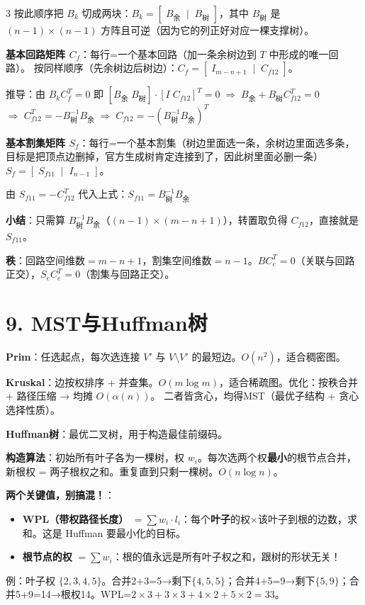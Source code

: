 \documentclass[10pt,a4paper,landscape]{ctexart}
\begin{document}
\begin{multicols}{3}
按此顺序把 $B_k$ 切成两块：$\boxed{B_k=[\;B_{\text{余}}\;\mid\;B_{\text{树}}\;]}$，其中 $B_{\text{树}}$ 是 $(n-1)\times(n-1)$ 方阵且可逆（因为它的列正好对应一棵支撑树）。

\textbf{基本回路矩阵 $C_f$}：每行=一个基本回路（加一条余树边到 $T$ 中形成的唯一回路）。
按同样顺序（先余树边后树边）：$\boxed{C_f=[\;I_{m-n+1}\;\mid\;C_{f12}\;]}$。

推导：由 $B_kC_f^T=0$ 即 $[B_{\text{余}}\;B_{\text{树}}]\cdot[I\;C_{f12}]^T=0\;\Rightarrow\;B_{\text{余}}+B_{\text{树}}C_{f12}^T=0$
$\Rightarrow\;C_{f12}^T=-B_{\text{树}}^{-1}B_{\text{余}}\;\Rightarrow\;\boxed{C_{f12}=-(B_{\text{树}}^{-1}B_{\text{余}})^T}$

\textbf{基本割集矩阵 $S_f$}：每行=一个基本割集（树边里面选一条，余树边里面选多条，目标是把顶点边删掉，官方生成树肯定连接到了，因此树里面必删一条）
$\boxed{S_f=[\;S_{f11}\;\mid\;I_{n-1}\;]}$。

由 $S_{f11}=-C_{f12}^T$ 代入上式：$\boxed{S_{f11}=B_{\text{树}}^{-1}B_{\text{余}}}$

\textbf{小结}：只需算 $B_{\text{树}}^{-1}B_{\text{余}}$（$(n-1)\times(m-n+1)$），转置取负得 $C_{f12}$，直接就是 $S_{f11}$。

\textbf{秩}：回路空间维数$=m-n+1$，割集空间维数$=n-1$。$BC_e^T=0$（关联与回路正交），$S_eC_e^T=0$（割集与回路正交）。

\section*{9. MST与Huffman树}

\textbf{Prim}：任选起点，每次选连接 $V'$ 与 $V\setminus V'$ 的最短边。$O(n^2)$，适合稠密图。

\textbf{Kruskal}：边按权排序 + 并查集。$O(m\log m)$，适合稀疏图。优化：按秩合并 + 路径压缩 → 均摊 $O(\alpha(n))$。
二者皆贪心，均得MST（最优子结构 + 贪心选择性质）。

\textbf{Huffman树}：最优二叉树，用于构造最佳前缀码。

\textbf{构造算法}：初始所有叶子各为一棵树，权 $w_i$。每次选两个权\textbf{最小}的根节点合并，新根权 = 两子根权之和。重复直到只剩一棵树。$O(n\log n)$。

\textbf{两个关键值，别搞混！}：
\begin{itemize}
\item \textbf{WPL（带权路径长度）} $=\sum w_i\cdot l_i$：每个\textbf{叶子}的权×该叶子到根的边数，求和。这是 Huffman 要最小化的目标。
\item \textbf{根节点的权} $=\sum w_i$：根的值永远是所有叶子权之和，跟树的形状无关！
\end{itemize}
例：叶子权 $\{2,3,4,5\}$。合并2+3=5→剩下$\{4,5,5\}$；合并4+5=9→剩下$\{5,9\}$；合并5+9=14→根权14。WPL=$2\times3+3\times3+4\times2+5\times2=33$。


\end{multicols}
\end{document}
